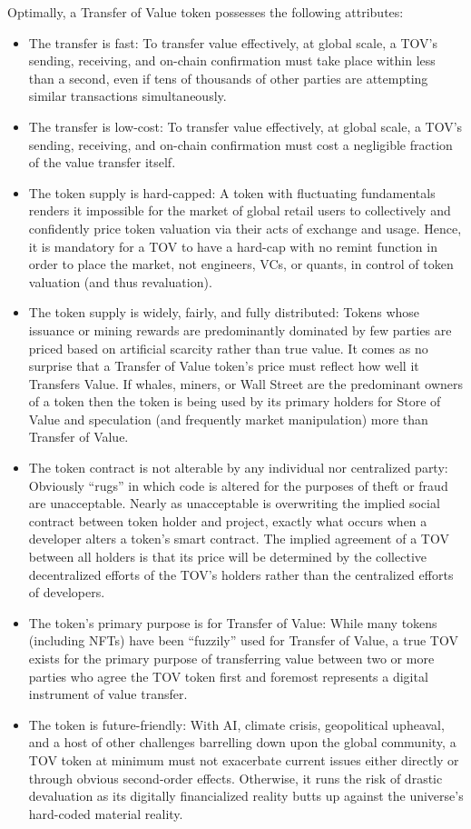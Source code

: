 \documentclass{article}
\begin{document}
Optimally, a Transfer of Value token possesses the following attributes:

\begin{itemize}
\item The transfer is fast: To transfer value effectively, at global scale, a TOV's sending, receiving, and on-chain confirmation must take place within less than a second, even if tens of thousands of other parties are attempting similar transactions simultaneously.
\item The transfer is low-cost: To transfer value effectively, at global scale, a TOV's sending, receiving, and on-chain confirmation must cost a negligible fraction of the value transfer itself.
\item The token supply is hard-capped: A token with fluctuating fundamentals renders it impossible for the market of global retail users to collectively and confidently price token valuation via their acts of exchange and usage. Hence, it is mandatory for a TOV to have a hard-cap with no remint function in order to place the market, not engineers, VCs, or quants, in control of token valuation (and thus revaluation).
\item The token supply is widely, fairly, and fully distributed: Tokens whose issuance or mining rewards are predominantly dominated by few parties are priced based on artificial scarcity rather than true value. It comes as no surprise that a Transfer of Value token's price must reflect how well it Transfers Value. If whales, miners, or Wall Street are the predominant owners of a token then the token is being used by its primary holders for Store of Value and speculation (and frequently market manipulation) more than Transfer of Value.
\item The token contract is not alterable by any individual nor centralized party: Obviously ``rugs'' in which code is altered for the purposes of theft or fraud are unacceptable. Nearly as unacceptable is overwriting the implied social contract between token holder and project, exactly what occurs when a developer alters a token's smart contract. The implied agreement of a TOV between all holders is that its price will be determined by the collective decentralized efforts of the TOV's holders rather than the centralized efforts of developers.
\item The token's primary purpose is for Transfer of Value: While many tokens (including NFTs) have been ``fuzzily'' used for Transfer of Value, a true TOV exists for the primary purpose of transferring value between two or more parties who agree the TOV token first and foremost represents a digital instrument of value transfer.
\item The token is future-friendly: With AI, climate crisis, geopolitical upheaval, and a host of other challenges barrelling down upon the global community, a TOV token at minimum must not exacerbate current issues either directly or through obvious second-order effects. Otherwise, it runs the risk of drastic devaluation as its digitally financialized reality butts up against the universe's hard-coded material reality.
\end{itemize}
\end{document}
